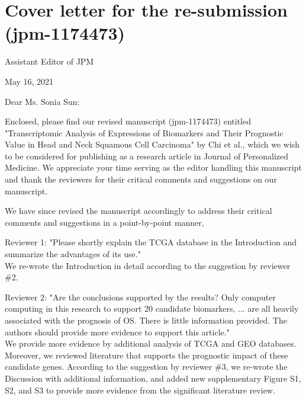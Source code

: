 \documentclass[preprint,12pt]{elsarticle}
\begin{document}
\section*{Cover letter for the re-submission (jpm-1174473)} 
 


Assistant Editor of JPM%

May 16, 2021

Dear Ms. Sonia Sun:

Enclosed, please find our revised manuscript (jpm-1174473) entitled "Transcriptomic Analysis of Expressions of Biomarkers and Their Prognostic Value in Head and Neck Squamous Cell Carcinoma" by Chi et al., which we wish to be considered for publishing as a research article in Journal of Personalized Medicine. We appreciate your time serving as the editor handling this manuscript and thank the reviewers for their critical comments and suggestions on our manuscript.

We have since revised the manuscript accordingly to address their critical comments and suggestions in a point-by-point manner, 


Reviewer 1: %
"Please shortly explain the TCGA database in the Introduction and summarize the advantages of its use."\\
We re-wrote the Introduction in detail according to the suggestion by reviewer \#2. %

Reviewer 2: %
"Are the conclusions supported by the results?
Only computer computing in this research to support 20 candidate biomarkers, ... are all heavily associated with the prognosis of OS.
There is little information provided. The authors should provide more evidence to support this article."\\
We provide more evidence by additional analysis of TCGA and GEO databases. Moreover, we reviewed literature that supports the prognostic impact of these candidate genes.
According to the suggestion by reviewer \#3,
we re-wrote the Discussion with additional information, and
added new supplementary Figure S1, S2, and S3 %
to provide more evidence from the significant literature review.
\end{document}
